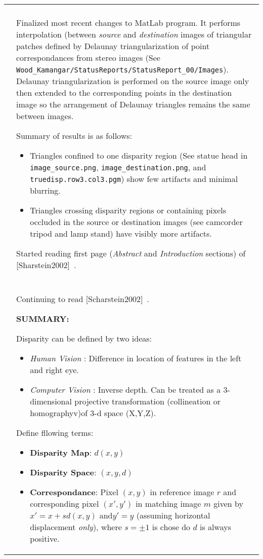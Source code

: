 \documentclass[a4paper,10pt]{article}
\newcommand{\logentry}[4]{\hline\\[-0.25ex]\selectlanguage{USenglish}\formatdate{#2}{#1}{#3}&{#4}\par\\[-0.25ex]}
\newcommand{\SUMMARY}[1]{%
	{\noindent\textbf{\color{blue}SUMMARY: }{\noindent #1} \noindent}
}
\begin{document}
\begin{longtable}{l p{12cm} }
{		}
		\logentry{6}{8}{2016}{%
Finalized most recent changes to MatLab program. It performs interpolation (between \textit{source} and \textit{destination} images of triangular patches defined by Delaunay triangularization of point correspondances from stereo images (See \texttt{Wood\_Kamangar/StatusReports/StatusReport\_00/Images}). Delaunay triangularization is performed on the source image only then extended to the corresponding points in the destination image so the arrangement of Delaunay triangles remains the same between images.\newline
\par Summary of results is as follows:
\begin{itemize}
\item Triangles confined to one disparity region (See statue head in \texttt{image\_source.png}, \texttt{image\_destination.png}, and \texttt{truedisp.row3.col3.pgm}) show few artifacts and minimal blurring.
\item Triangles crossing disparity regions or containing pixels occluded in the source or destination images (see camcorder tripod and lamp stand) have visibly more artifacts.\newline
\end{itemize}
\par Started reading first page (\textit{Abstract} and \textit{Introduction} sections) of [Sharstein2002]~\cite{Scharstein2002}.
		}
		\logentry{6}{9}{2016}{%
Continuing to read [Scharstein2002]~\cite{Scharstein2002}.\newline
\par
\SUMMARY{
Disparity can be defined by two ideas:
\begin{itemize}
\item \textit{Human Vision} : Difference in location of features in the left and right eye.
\item \textit{Computer Vision} : Inverse depth. Can be treated as a 3-dimensional projective transformation (collineation or homographyv)of 3-d space (X,Y,Z).
\newline
\end{itemize}
\par Define fllowing terms:
\begin{itemize} 
\item \textbf{Disparity Map}: $d(x,y)$
\item \textbf{Disparity Space}: $(x,y,d)$
\item \textbf{Correspondance}: Pixel $(x,y)$ in reference image $r$ and corresponding pixel $(x',y')$ in matching image $m$ given by $x' = x + s d(x,y)$ and$y' = y$ (assuming horizontal displacement \textit{only}), where $s = \pm 1$ is chose do $d$ is always positive. 

\end{itemize}}}
\end{longtable}
\end{document}
